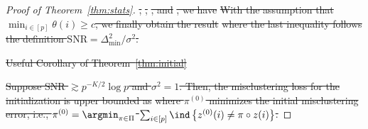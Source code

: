 \documentclass[lettersize,onecolumn,journal]{IEEEtran}
\theoremstyle{definition}
\newtheorem{cor}{Corollary}
\theoremstyle{definition}
\newcommand{\of}[1]{\left(#1\right)}
\newcommand{\offf}[1]{\left\{#1\right\}}
\providecommand{\DIFdeltex}[1]{{\protect\color{red}\sout{#1}}}                      %
\providecommand{\DIFdel}[1]{\texorpdfstring{\DIFdeltex{#1}}{}} %
\begin{document}
\begin{proof}[Proof of Theorem~\ref{thm:stats}]
\DIFdel{, }%
\DIFdel{, }%
\DIFdel{, and }%
\DIFdel{, we have 
    }%
\DIFdel{With the assumption that $\min_{i \in [p]} \theta(i) \geq c$, we finally obtain the result
    }%
\DIFdel{where the last inequality follows the definition $\text{SNR} = \Delta_{\min}^2/\sigma^2$.
}%

\DIFdel{Useful Corollary of Theorem~\ref{thm:initial}}%

\DIFdel{Suppose SNR $\gtrsim p^{-K/2} \log p$ and  $\sigma^2 = 1$. Then, the misclustering loss for the initialization is upper bounded as 
}%
\DIFdel{where $\pi^{(0)}$ minimizes the initial misclustering error, i.e., $\pi^{(0)} = \argmin_{\pi \in \Pi} $ $ \sum_{i \in [p]}\ind \offf{z^{(0)}(i) \neq \pi \circ z(i) }$.
}%


\end{proof}
\end{document}
